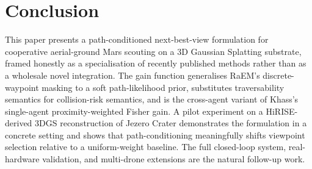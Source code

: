 \documentclass[conference]{IEEEtran}
\begin{document}
\section{Conclusion}
This paper presents a path-conditioned next-best-view formulation for cooperative aerial-ground Mars scouting on a 3D Gaussian Splatting substrate, framed honestly as a specialisation of recently published methods rather than as a wholesale novel integration. The gain function generalises RaEM's discrete-waypoint masking to a soft path-likelihood prior, substitutes traversability semantics for collision-risk semantics, and is the cross-agent variant of Khass's single-agent proximity-weighted Fisher gain. A pilot experiment on a HiRISE-derived 3DGS reconstruction of Jezero Crater demonstrates the formulation in a concrete setting and shows that path-conditioning meaningfully shifts viewpoint selection relative to a uniform-weight baseline. The full closed-loop system, real-hardware validation, and multi-drone extensions are the natural follow-up work.



\end{document}

